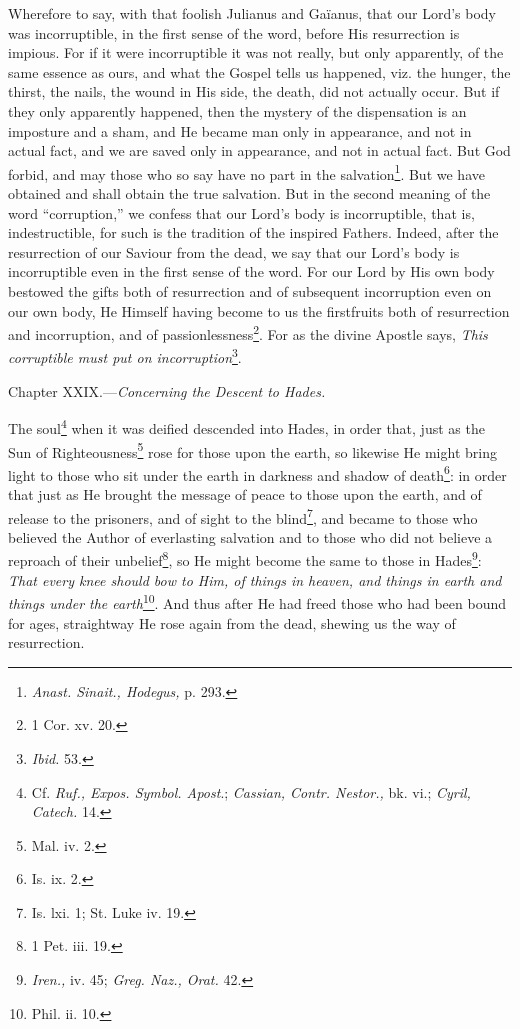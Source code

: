 Wherefore to say, with that foolish Julianus and Gaïanus, that our Lord’s body was incorruptible, in the first sense of the word, before His resurrection is impious. For if it were incorruptible it was not really, but only apparently, of the same essence as ours, and what the Gospel tells us happened, viz. the hunger, the thirst, the nails, the wound in His side, the death, did not actually occur. But if they only apparently happened, then the mystery of the dispensation is an imposture and a sham, and He became man only in appearance, and not in actual fact, and we are saved only in appearance, and not in actual fact. But God forbid, and may those who so say have no part in the salvation\footnote{\emph{Anast. Sinait., Hodegus, }p. 293.}. But we have obtained and shall obtain the true salvation. But in the second meaning of the word “corruption,” we confess that our Lord’s body is incorruptible, that is, indestructible, for such is the tradition of the inspired Fathers. Indeed, after the resurrection of our Saviour from the dead, we say that our Lord’s body is incorruptible even in the first sense of the word. For our Lord by His own body bestowed the gifts both of resurrection and of subsequent incorruption even on our own body, He Himself having become to us the firstfruits both of resurrection and incorruption, and of passionlessness\footnote{1 Cor. xv. 20.}. For as the divine Apostle says, \emph{This corruptible must put on incorruption}\footnote{\emph{Ibid.} 53.}.


Chapter XXIX.—\emph{Concerning the Descent to Hades.}

The soul\footnote{Cf. \emph{Ruf., Expos. Symbol. Apost}.; \emph{Cassian, Contr. Nestor., }bk. vi.; \emph{Cyril, Catech. }14.} when it was deified descended into Hades, in order that, just as the Sun of Righteousness\footnote{Mal. iv. 2.} rose for those upon the earth, so likewise He might bring light to those who sit under the earth in darkness and shadow of death\footnote{Is. ix. 2.}: in order that just as He brought the message of peace to those upon the earth, and of release to the prisoners, and of sight to the blind\footnote{Is. lxi. 1; St. Luke iv. 19.}, and became to those who believed the Author of everlasting salvation and to those who did not believe a reproach of their unbelief\footnote{1 Pet. iii. 19.}, so He might become the same to those in Hades\footnote{\emph{Iren.,} iv. 45; \emph{Greg. Naz., Orat. }42.}: \emph{That every knee should bow to Him, of things in heaven, and things in earth and things under the earth}\footnote{Phil. ii. 10.}. And thus after He had freed those who had been bound for ages, straightway He rose again from the dead, shewing us the way of resurrection.

